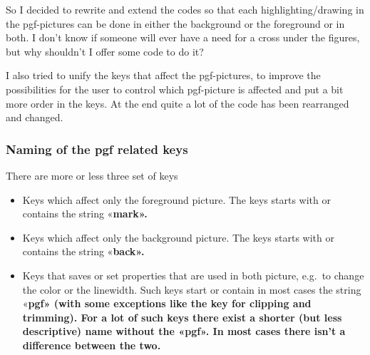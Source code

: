 \documentclass[pagesize,parskip=half-,fontsize=12pt]{scrartcl}
\begin{document}
So I decided to rewrite and extend the codes so that each
highlighting/drawing in the pgf-pictures can be done in either the
background or the foreground or in both. I don't know if someone will
ever have a need for a cross under the figures, but why shouldn't I
offer some code to do it?

I also tried to unify the keys that affect the pgf-pictures, to
improve the possibilities for the user to  control which pgf-picture
is affected and put a bit more order in the keys. At the end quite a
lot of the code has been rearranged and changed.


\subsubsection{Naming of the pgf related keys}

There are more or less three set of keys

\begin{itemize}
\item Keys which affect only the foreground picture. The keys starts with or contains the
string «\bfseries\ttfamily mark».
\item  Keys which affect only the background picture. The keys starts with or contains the
string «\bfseries\ttfamily back».

\item
Keys that saves or set properties that are used in both picture,
e.g.\ to change the color or the linewidth. Such keys start or
contain in most cases the string  «\bfseries\ttfamily pgf» (with some
exceptions like the key for clipping and trimming). For a lot of such
keys there exist a shorter (but less descriptive) name without the
«\ttfamily pgf». In most cases there isn't a difference between the
two.

\end{itemize}
%
\end{document}
